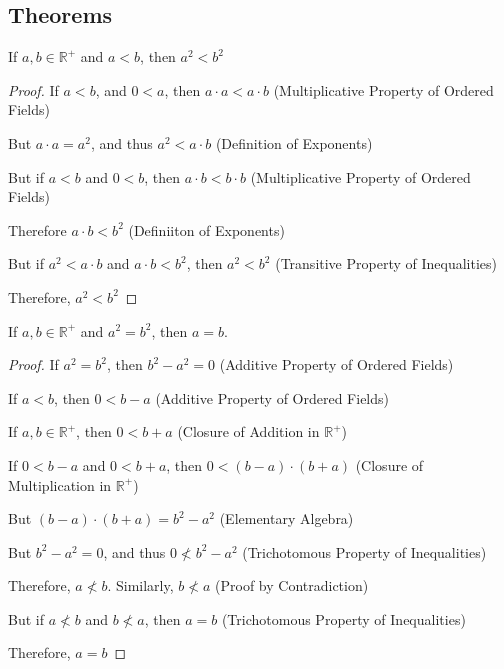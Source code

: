         \subsection{Theorems}
            \begin{theorem}
                \label{%
                    Theorem:MathEnc:Analysis:Sum:SqurPresIneqPosNum%
                }
                If $a,b\in\mathbb{R}^{+}$ and $a<b$,
                then $a^{2}<b^{2}$
            \end{theorem}
            \begin{proof}
                If $a<b$, and $0<a$, then $a\cdot a<a\cdot b$
                \hfill
                (Multiplicative Property of Ordered Fields)\par
                But $a\cdot a = a^{2}$, and thus $a^{2}<a\cdot b$
                \hfill
                (Definition of Exponents)\par
                But if $a<b$ and $0<b$, then $a\cdot b<b\cdot b$
                \hfill
                (Multiplicative Property of Ordered Fields)\par
                Therefore $a\cdot b<b^{2}$
                \hfill
                (Definiiton of Exponents)\par
                But if $a^{2}<a\cdot b$ and $a\cdot b<b^{2}$,
                then $a^{2}<b^{2}$
                \hfill
                (Transitive Property of Inequalities)\par
                Therefore, $a^{2}<b^{2}$
            \end{proof}
            \begin{theorem}
                If $a,b\in\mathbb{R}^{+}$ and $a^{2}=b^{2}$,
                then $a=b$.
            \end{theorem}
            \begin{proof}
                If $a^{2}=b^{2}$, then $b^{2}-a^{2}=0$\hfill
                (Additive Property of Ordered Fields)\par
                If $a<b$, then $0<b-a$\hfill
                (Additive Property of Ordered Fields)\par
                If $a,b\in\mathbb{R}^{+}$, then $0<b+a$
                \hfill
                (Closure of Addition in $\mathbb{R}^{+}$)\par
                If $0<b-a$ and $0<b+a$, then $0<(b-a)\cdot (b+a)$
                \hfill
                (Closure of Multiplication in $\mathbb{R}^{+}$)\par
                But $(b-a)\cdot(b+a)=b^{2}-a^{2}$
                \hfill
                (Elementary Algebra)\par
                But $b^{2}-a^{2}=0$, and thus $0\not<b^{2}-a^{2}$
                \hfill
                (Trichotomous Property of Inequalities)\par
                Therefore, $a\not<b$. Similarly, $b\not<a$
                \hfill
                (Proof by Contradiction)\par
                But if $a\not<b$ and $b\not<a$, then $a=b$
                \hfill
                (Trichotomous Property of Inequalities)\par
                Therefore, $a=b$
            \end{proof}
